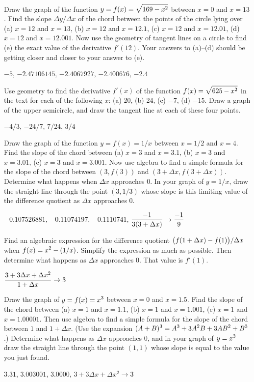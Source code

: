 \begin{exercises}

\exercise
Draw the graph of the function $\displaystyle y=f(x)=\sqrt{169-x^2}$ between $x=0$
and $x=13$.  Find the slope $\Delta y/\Delta x$ of the chord between the
points of the circle lying over (a) $x=12$ and $x=13$, (b) $x=12$ and
$x=12.1$,  (c) $x=12$ and $x=12.01$, (d) $x=12$ and $x=12.001$.  Now use
the geometry of tangent lines on a circle to find (e) the exact value of the
derivative $f'(12)$.  Your answers to (a)--(d) should be getting closer and
closer to your answer to (e).
\begin{answer} $-5$, $-2.47106145$, $-2.4067927$, $-2.400676$, $-2.4$
\end{answer}

\exercise
Use geometry to find the derivative $f'(x)$ of the function
$\displaystyle f(x)=\sqrt{625-x^2}$ in the text for each of the following $x$: (a) 20,
(b) 24, (c) $-7$, (d) $-15$.  Draw a graph of the upper semicircle, and
draw the tangent line at each of these four points.
\begin{answer} $-4/3$, $-24/7$, $7/24$, $3/4$
\end{answer}


\exercise
Draw the graph of the function $y=f(x)=1/x$ between $x=1/2$ and $x=4$.
Find the slope of the chord between (a) $x=3$ and $x=3.1$, (b) $x=3$ and
$x=3.01$, (c) $x=3$ and $x=3.001$.  Now use algebra to find a simple
formula for the slope of the chord between $(3,f(3))$ and $(3+\Delta
x,f(3+\Delta x))$.  Determine what happens when $\Delta x$ approaches 0.
In your graph of $y=1/x$, draw the straight line through the point
$(3,1/3)$ whose slope is this limiting value of the difference quotient as
$\Delta x$ approaches 0.
\begin{answer} $-0.107526881$, $-0.11074197$, $-0.1110741$, 
$\displaystyle{-1\over3(3+\Delta x)}\rightarrow {-1\over9}$
\end{answer}

\exercise
Find an algebraic expression for the difference quotient $\displaystyle \bigl(f(1+\Delta
x)-f(1)\bigr)/\Delta x$ when $\displaystyle f(x)=x^2-(1/x)$.  Simplify the expression as
much as possible.  Then determine what happens as $\Delta x$ approaches 0.
That value is $f'(1)$.
\begin{answer} $\displaystyle{3+3\Delta x+\Delta x^2\over1+\Delta x}\rightarrow3$ 
\end{answer}

\exercise
Draw the graph of $\displaystyle y=f(x)=x^3$ between $x=0$ and $x=1.5$.  Find the slope
of the chord between (a) $x=1$ and $x=1.1$, (b) $x=1$ and $x=1.001$, (c)
$x=1$ and $x=1.00001$.  Then use algebra to find a simple formula for the
slope of the chord between $1$ and $1+\Delta x$.  (Use the expansion
$\displaystyle (A+B)^3=A^3+3A^2B+3AB^2+B^3$.)  Determine what happens as $\Delta x$
approaches 0, and in your graph of $\displaystyle y=x^3$ draw the straight line through
the point $(1,1)$ whose slope is equal to the value you just found.
\begin{answer} $3.31$, $3.003001$, $3.0000$,\hfill\break
 $3+3\Delta x+\Delta x^2\rightarrow3$
\end{answer}


\end{exercises}
